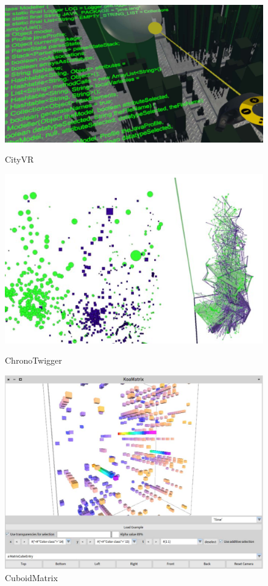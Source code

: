 \begin{figure}[ht]
  \centering
    \includegraphics[width=\linewidth]{CityVR.png}
    \caption{CityVR}
    \label{fig:CityVR}
  \endminipage\hfill
  \centering
    \includegraphics[width=\linewidth]{ChronoTwigger.png}
    \caption{ChronoTwigger}
    \label{fig:ChronoTwigger}
  \endminipage\hfill
  \centering
    \includegraphics[width=\linewidth]{CuboidMatrix.png}
    \caption{CuboidMatrix}
    \label{fig:CuboidMatrix}
  \endminipage
  \end{figure}
  


